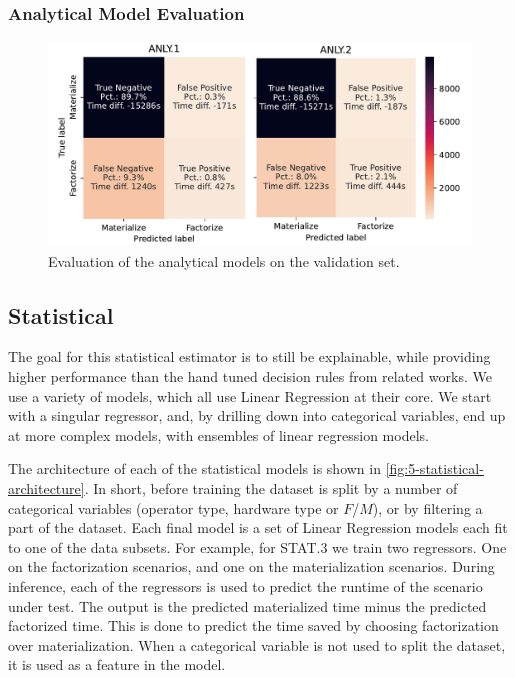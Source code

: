 \subsubsection{Analytical Model Evaluation}
\begin{figure}[ht]
    \centering
    \includegraphics[width=0.9\linewidth]{chapters/05_cost_estimation/figures/analytical-models-compare.pdf}
    \caption[Analytical Model Evaluation]{Evaluation of the analytical models on the validation set. }
    \label{fig:5-analytical-model-evaluation}
\end{figure}


\subsection{Statistical}
The goal for this statistical estimator is to still be explainable, while providing higher performance than the hand tuned decision rules from related works. We use a variety of models, which all use Linear Regression at their core. We start with a singular regressor, and, by drilling down into categorical variables, end up at more complex models, with ensembles of linear regression models.

The architecture of each of the statistical models is shown in \autoref{fig:5-statistical-architecture}. In short, before training the dataset is split by a number of categorical variables (operator type, hardware type or $F$/$M$), or by filtering a part of the dataset. Each final model is a set of Linear Regression models each fit to one of the data subsets. For example, for STAT.3 we train two regressors. One on the factorization scenarios, and one on the materialization scenarios. During inference, each of the regressors is used to predict the runtime of the scenario under test. The output is the predicted materialized time minus the predicted factorized time. This is done to predict the time saved by choosing factorization over materialization. When a categorical variable is not used to split the dataset, it is used as a feature in the model.

